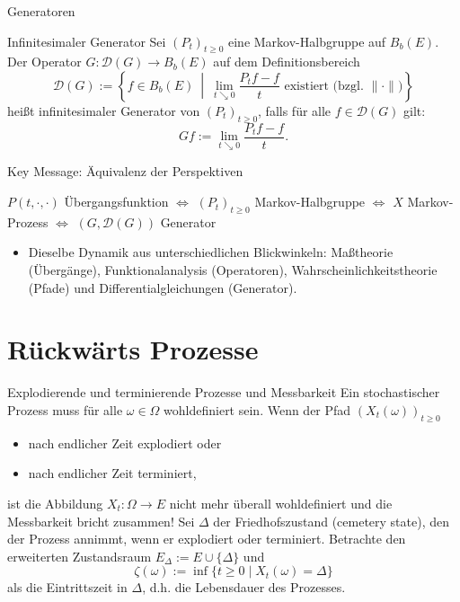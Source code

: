 \documentclass[11pt,aspectratio=169]{beamer}
\begin{document}
\begin{frame}{Generatoren}
\begin{block}{Infinitesimaler Generator}
  Sei $(P_t)_{t \geq 0}$ eine Markov-Halbgruppe auf $B_b(E)$. Der Operator $G: \mathcal{D}(G) \to B_b(E)$ auf dem Definitionsbereich 
  \[
  \mathcal{D}(G) := \left\{ f \in B_b(E) \ \middle| \ \lim_{t \searrow 0} \frac{P_t f - f}{t} \text{ existiert (bzgl. $\| \cdot \|$)} \right\}
  \] 
  heißt infinitesimaler Generator von $(P_t)_{t \geq 0}$, falls für alle $f \in \mathcal{D}(G)$ gilt:
  \[
  Gf := \lim_{t \searrow 0} \frac{P_t f - f}{t}.
  \]
\end{block}
\end{frame}


\begin{frame}{Key Message: Äquivalenz der Perspektiven}

  $P(t,\cdot,\cdot)$ Übergangsfunktion $\iff$ $(P_t)_{t \geq 0}$ Markov-Halbgruppe $\iff$ $X$ Markov-Prozess $\iff$ $(G,\mathcal{D}(G))$ Generator
  
  \vspace{1cm}
  \begin{itemize}
      \item Dieselbe Dynamik aus unterschiedlichen Blickwinkeln: Maßtheorie (Übergänge), Funktionalanalysis (Operatoren), Wahrscheinlichkeitstheorie (Pfade) und Differentialgleichungen (Generator).
  \end{itemize}
\end{frame}


\section{Rückwärts Prozesse}
\begin{frame}{Explodierende und terminierende Prozesse und Messbarkeit}
Ein stochastischer Prozess muss für alle $\omega \in \Omega$ wohldefiniert sein. Wenn der Pfad $(X_t(\omega))_{t \geq 0}$
\begin{itemize}
  \item nach endlicher Zeit explodiert oder 
  \item nach endlicher Zeit terminiert,
\end{itemize} 
ist die Abbildung $X_t: \Omega \to E$ nicht mehr überall wohldefiniert und die Messbarkeit bricht zusammen! Sei $\Delta$ der Friedhofszustand (cemetery state), den der Prozess annimmt, wenn er explodiert oder terminiert. Betrachte den erweiterten Zustandsraum $E_\Delta := E \cup \{\Delta\}$ und 
\[
\zeta (\omega) := \inf \{ t \geq 0 \mid X_t(\omega) = \Delta \}
\]
als die Eintrittszeit in $\Delta$, d.h. die Lebensdauer des Prozesses.
\end{frame}
\end{document}

